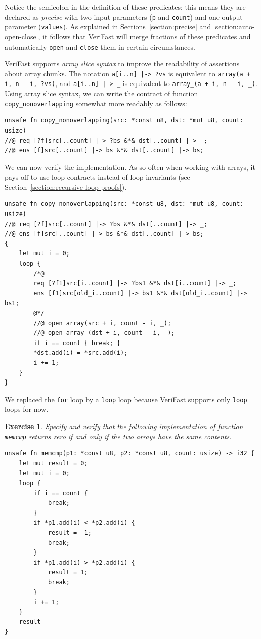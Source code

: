 \documentclass{article}
\newtheorem{exercise}{Exercise}
\begin{document}
Notice the semicolon in the definition of these predicates:
this means they are declared as \emph{precise} with
two input parameters (\lstinline|p| and \lstinline|count|)
and one output parameter (\lstinline|values|). As explained in
Sections~\ref{section:precise} and
\ref{section:auto-open-close}, it follows that VeriFast will
merge fractions of these predicates and automatically
\lstinline|open| and \lstinline|close| them
in certain circumstances.

VeriFast supports \emph{array slice syntax} to improve the
readability of assertions about array chunks. The
notation \lstinline$a[i..n] |-> ?vs$ is equivalent to %
\lstinline$array(a + i, n - i, ?vs)$, and \lstinline$a[i..n] |-> _$ is equivalent
to \lstinline$array_(a + i, n - i, _)$. Using array slice syntax,
we can write the contract of function \lstinline|copy_nonoverlapping|
somewhat more readably as follows:
\begin{lstlisting}
unsafe fn copy_nonoverlapping(src: *const u8, dst: *mut u8, count: usize)
//@ req [?f]src[..count] |-> ?bs &*& dst[..count] |-> _;
//@ ens [f]src[..count] |-> bs &*& dst[..count] |-> bs;
\end{lstlisting}

We can now verify the implementation. As so often when working
with arrays, it pays off to use loop contracts instead of loop
invariants (see Section~\ref{section:recursive-loop-proofs}).
\begin{lstlisting}
unsafe fn copy_nonoverlapping(src: *const u8, dst: *mut u8, count: usize)
//@ req [?f]src[..count] |-> ?bs &*& dst[..count] |-> _;
//@ ens [f]src[..count] |-> bs &*& dst[..count] |-> bs;
{
    let mut i = 0;
    loop {
        /*@
        req [?f1]src[i..count] |-> ?bs1 &*& dst[i..count] |-> _;
        ens [f1]src[old_i..count] |-> bs1 &*& dst[old_i..count] |-> bs1;
        @*/
        //@ open array(src + i, count - i, _);
        //@ open array_(dst + i, count - i, _);
        if i == count { break; }
        *dst.add(i) = *src.add(i);
        i += 1;
    }
}
\end{lstlisting}
We replaced the \lstinline|for| loop by a \lstinline|loop| loop because VeriFast supports only \lstinline|loop| loops
for now.

\begin{exercise}\label{exercise:memcmp}
Specify and verify that the following implementation of
function \lstinline|memcmp| returns zero if and only if the two
arrays have the same contents.
\begin{lstlisting}
unsafe fn memcmp(p1: *const u8, p2: *const u8, count: usize) -> i32 {
    let mut result = 0;
    let mut i = 0;
    loop {
        if i == count {
            break;
        }
        if *p1.add(i) < *p2.add(i) {
            result = -1;
            break;
        }
        if *p1.add(i) > *p2.add(i) {
            result = 1;
            break;
        }
        i += 1;
    }
    result
}
\end{lstlisting}
\end{exercise}
\end{document}
